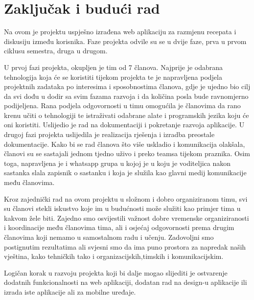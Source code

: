 \chapter{Zaključak i budući rad}
		
		
        Na ovom je projektu uspješno izrađena web aplikaciju za razmjenu recepata i diskusiju između korisnika. Faze projekta odvile su se u dvije faze, prva u prvom ciklusu semestra, druga u drugom.
        
        U prvoj fazi projekta, okupljen je tim od 7 članova. Najprije je odabrana tehnologija koja će se koristiti tijekom projekta te je napravljena podjela projektnih zadataka po interesima i sposobnostima članova, gdje je ujedno bio cilj da svi dođu u dodir sa svim fazama razvoja i da količina posla bude ravnomjerno podijeljena. Rana podjela odgovornosti u timu omogućila je članovima da rano krenu učiti o tehnologiji te istraživati odabrane alate i programskih jezika koju će oni koristiti. Uslijedio je rad na dokumentaciji i pokretanje razvoja aplikacije.
        U drugoj fazi projekta uslijedila je realizacija rješenja i izradba preostale dokumentacije. Kako bi se rad članova što više uskladio i komunikacija olakšala, članovi su se sastajali jednom tjedno uživo i preko teamsa tijekom praznika. Osim toga, napravljena je i whatsapp grupa u kojoj je u koju je voditeljica nakon sastanka slala zapisnik o sastanku i koja je služila kao glavni medij komunikacije među članovima.
        
        Kroz zajednički rad na ovom projektu u složnom i dobro organiziranom timu, svi su članovi stekli iskustvo koje im u budućnosti može služiti kao primjer tima u kakvom žele biti. Zajedno smo osvijestili važnost dobre vremenske organiziranosti i koordinacije među članovima tima, ali i osjećaj odgovornosti prema drugim članovima koji nemamo u samostalnom radu i učenju. Zadovoljni smo postignutim rezultatima ali svjesni smo da ima puno prostora za napredak naših vještina, kako tehničkih tako i organizacijskih,timskih i komunikacijskim.

        Logičan korak u razvoju projekta koji bi dalje mogao slijediti je ostvarenje dodatnih funkcionalnosti na web aplikaciji, dodatan rad na design-u aplikacije ili izrada iste aplikacije ali za mobilne uređaje.
		\eject 